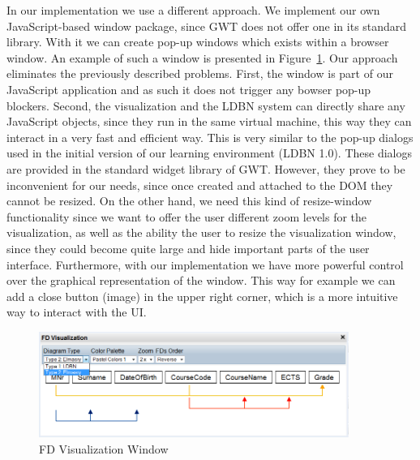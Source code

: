 In our implementation we use a different approach. We implement our own 
JavaScript-based window package, since GWT does not offer one in its standard library.
With it we can create pop-up windows which exists within a browser window. 
An example of such a window is presented in Figure~\ref{fig:fd-visual-win}. 
Our approach eliminates the previously described problems. First,
the window is part of our JavaScript application and as such it does not 
trigger any bowser pop-up blockers. 
Second, the visualization and the LDBN system can directly share any 
JavaScript objects, since they run in the same virtual machine, 
this way they can interact in a very fast and efficient way. 
This is very similar to the pop-up dialogs used in the initial version of our learning environment (LDBN 1.0). 
These dialogs are provided in the standard widget library of GWT. 
However, they prove to be inconvenient for our needs, since once created and attached 
to the DOM they cannot be resized. On the other hand, we
need this kind of resize-window functionality since we want to offer the user
different zoom levels for the visualization, as well as the ability the user to resize the
visualization window, since they could become quite large and hide important parts of the user 
interface. Furthermore, with our implementation we have more powerful control over
the graphical representation of the window. This way for example we can add a close button (image)
in the upper right corner, which is a more intuitive way to interact with the UI.

\begin{figure}[h]
	\begin{center}
		\includegraphics[width=0.9\textwidth]{./img/fd-visual-win.png}
		\caption{FD Visualization Window}
		\label{fig:fd-visual-win}
	\end{center}
\end{figure}

